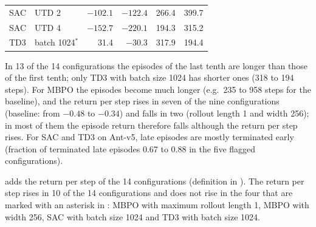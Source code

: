 \begin{table}[tb]
\begin{tabular}{llrrrr}
    SAC       & UTD 2             & $-102.1$                   & $-122.4$                                & 266.4        & 399.7       \\
    SAC       & UTD 4             & $-152.7$                   & $-220.1$                                & 194.3        & 315.2       \\
    TD3       & batch 1024$^\ast$ & 31.4                       & $-30.3$                                 & 317.9        & 194.4       \\
    \bottomrule
  \end{tabular}
\end{table}

In \num{13} of the \num{14} configurations the episodes of the last tenth are longer than those of the first tenth; only TD3 with batch size \num{1024} has shorter ones (\num{318} to \num{194} steps).
For MBPO the episodes become much longer (e.g.\ \num{235} to \num{958} steps for the baseline), and the return per step rises in seven of the nine configurations (baseline: from $-0.48$ to $-0.34$) and falls in two (rollout length \num{1} and width \num{256}); in most of them the episode return therefore falls although the return per step rises.
For SAC and TD3 on Ant-v5, late episodes are mostly terminated early (fraction of terminated late episodes \num{0.67} to \num{0.88} in the five flagged configurations).

 adds the return per step of the \num{14} configurations (definition in ).
The return per step rises in \num{10} of the \num{14} configurations and does not rise in the four that are marked with an asterisk in : MBPO with maximum rollout length \num{1}, MBPO with width \num{256}, SAC with batch size \num{1024} and TD3 with batch size \num{1024}.

